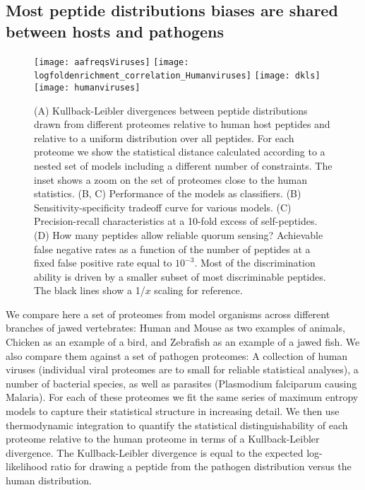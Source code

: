 \documentclass[superscriptaddress,twocolumn,pre]{revtex4}
\newcommand{\<}{\langle}
\renewcommand{\>}{\rangle}
\begin{document}
\subsection{Most peptide distributions biases are shared between hosts and pathogens}

\begin{figure*}
    \begin{center}
        \texttt{[image: aafreqsViruses]}
        \texttt{[image: logfoldenrichment\_correlation\_Humanviruses]}
        \texttt{[image: dkls]}
        \texttt{[image: humanviruses]}
    \end{center}
    \caption{(A) Kullback-Leibler divergences between peptide distributions drawn from different proteomes relative to human host peptides and relative to a uniform distribution over all peptides. For each proteome we show the statistical distance calculated according to a nested set of models including a different number of constraints. The inset shows a zoom on the set of proteomes close to the human statistics.
        (B, C) Performance of the models as classifiers. (B) Sensitivity-specificity tradeoff curve for various models. (C) Precision-recall characteristics at a 10-fold excess of self-peptides.
        (D) How many peptides allow reliable quorum sensing? Achievable false negative rates as a function of the number of peptides at a fixed false positive rate equal to $10^{-3}$. Most of the discrimination ability is driven by a smaller subset of most discriminable peptides. The black lines show a 1/$x$ scaling for reference. 
    \label{figdifferences}
    }
\end{figure*}

We compare here a set of proteomes from model organisms across different branches of jawed vertebrates: Human and Mouse as two examples of animals, Chicken as an example of a bird, and Zebrafish as an example of a jawed fish. We also compare them against a set of pathogen proteomes: A collection of human viruses (individual viral proteomes are to small for reliable statistical analyses), a number of bacterial species, as well as parasites (Plasmodium falciparum causing Malaria). For each of these proteomes we fit the same series of maximum entropy models to capture their statistical structure in increasing detail. We then use thermodynamic integration to quantify the statistical distinguishability of each proteome relative to the human proteome in terms of a Kullback-Leibler divergence. The Kullback-Leibler divergence is equal to the expected log-likelihood ratio for drawing a peptide from the pathogen distribution versus the human distribution. 
\end{document}
